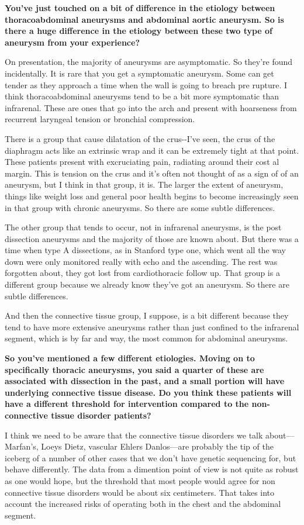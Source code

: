 \documentclass[
]{book}
\begin{document}
\textbf{You've just touched on a bit of difference in the etiology between
thoracoabdominal aneurysms and abdominal aortic aneurysm. So is there a
huge difference in the etiology between these two type of aneurysm from
your experience?}

On presentation, the majority of aneurysms are asymptomatic. So they're
found incidentally. It is rare that you get a symptomatic aneurysm. Some
can get tender as they approach a time when the wall is going to breach
pre rupture. I think thoracoabdominal aneurysms tend to be a bit more
symptomatic than infrarenal. These are ones that go into the arch and
present with hoarseness from recurrent laryngeal tension or bronchial
compression.

There is a group that cause dilatation of the crus-\/-I've seen, the crus
of the diaphragm acts like an extrinsic wrap and it can be extremely
tight at that point. These patients present with excruciating pain,
radiating around their cost al margin. This is tension on the crus and
it's often not thought of as a sign of of an aneurysm, but I think in
that group, it is. The larger the extent of aneurysm, things like weight
loss and general poor health begins to become increasingly seen in that
group with chronic aneurysms. So there are some subtle differences.

The other group that tends to occur, not in infrarenal aneurysms, is the
post dissection aneurysms and the majority of those are known about. But
there was a time when type A dissections, as in Stanford type one, which
went all the way down were only monitored really with echo and the
ascending. The rest was forgotten about, they got lost from
cardiothoracic follow up. That group is a different group because we
already know they've got an aneurysm. So there are subtle differences.

And then the connective tissue group, I suppose, is a bit different
because they tend to have more extensive aneurysms rather than just
confined to the infrarenal segment, which is by far and way, the most
common for abdominal aneurysms.

\textbf{So you've mentioned a few different etiologies. Moving on to
specifically thoracic aneurysms, you said a quarter of these are
associated with dissection in the past, and a small portion will have
underlying connective tissue disease. Do you think these patients will
have a different threshold for intervention compared to the
non-connective tissue disorder patients?}

I think we need to be aware that the connective tissue disorders we talk
about---Marfan's, Loeys Dietz, vascular Ehlers Danlos---are probably the
tip of the iceberg of a number of other cases that we don't have genetic
sequencing for, but behave differently. The data from a dimention point
of view is not quite as robust as one would hope, but the threshold that
most people would agree for non connective tissue disorders would be
about six centimeters. That takes into account the increased risks of
operating both in the chest and the abdominal segment.
\end{document}
